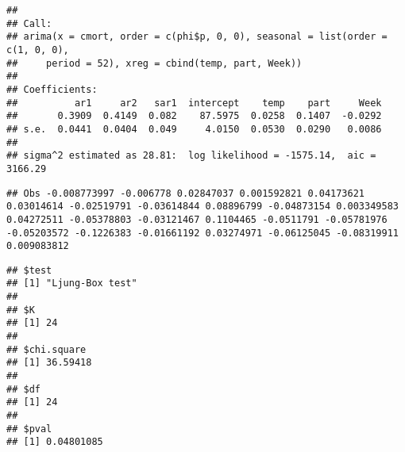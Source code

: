 \documentclass[]{article}
\newenvironment{Shaded}{\begin{snugshade}}{\end{snugshade}}
\newcommand{\KeywordTok}[1]{\textcolor[rgb]{0.13,0.29,0.53}{\textbf{#1}}}
\newcommand{\DataTypeTok}[1]{\textcolor[rgb]{0.13,0.29,0.53}{#1}}
\newcommand{\DecValTok}[1]{\textcolor[rgb]{0.00,0.00,0.81}{#1}}
\newcommand{\StringTok}[1]{\textcolor[rgb]{0.31,0.60,0.02}{#1}}
\newcommand{\CommentTok}[1]{\textcolor[rgb]{0.56,0.35,0.01}{\textit{#1}}}
\newcommand{\OperatorTok}[1]{\textcolor[rgb]{0.81,0.36,0.00}{\textbf{#1}}}
\newcommand{\NormalTok}[1]{#1}
\begin{document}
\begin{Shaded}
\end{Shaded}

\begin{verbatim}
## 
## Call:
## arima(x = cmort, order = c(phi$p, 0, 0), seasonal = list(order = c(1, 0, 0), 
##     period = 52), xreg = cbind(temp, part, Week))
## 
## Coefficients:
##          ar1     ar2   sar1  intercept    temp    part     Week
##       0.3909  0.4149  0.082    87.5975  0.0258  0.1407  -0.0292
## s.e.  0.0441  0.0404  0.049     4.0150  0.0530  0.0290   0.0086
## 
## sigma^2 estimated as 28.81:  log likelihood = -1575.14,  aic = 3166.29
\end{verbatim}

\begin{Shaded}
\end{Shaded}

\begin{verbatim}
## Obs -0.008773997 -0.006778 0.02847037 0.001592821 0.04173621 0.03014614 -0.02519791 -0.03614844 0.08896799 -0.04873154 0.003349583 0.04272511 -0.05378803 -0.03121467 0.1104465 -0.0511791 -0.05781976 -0.05203572 -0.1226383 -0.01661192 0.03274971 -0.06125045 -0.08319911 0.009083812
\end{verbatim}

\begin{verbatim}
## $test
## [1] "Ljung-Box test"
## 
## $K
## [1] 24
## 
## $chi.square
## [1] 36.59418
## 
## $df
## [1] 24
## 
## $pval
## [1] 0.04801085
\end{verbatim}
\end{document}
